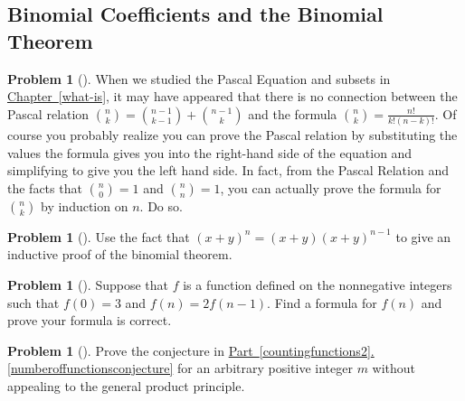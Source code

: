\documentclass[10pt,]{book}
\theoremstyle{plain}
\theoremstyle{definition}
\newtheorem{activity}[project]{Problem}
\theoremstyle{definition}
\numberwithin{equation}{chapter}
\newcommand{\importantarrow}{\Rightarrow}
\begin{document}
\subsection[{Binomial Coefficients and the Binomial Theorem}]{Binomial Coefficients and the Binomial Theorem}\label{subsection-12}
\begin{activity}[] \label{activity-72}
When we studied the Pascal Equation and subsets in \hyperref[what-is]{Chapter~\ref{what-is}}, it may have appeared that there is no connection between the Pascal relation \(\binom{n}{k} = \binom{n-1}{k-1} +\binom{n-1}{k}\) and the formula \(\binom{n}{k}=\frac{n!}{k!(n-k)!}\). Of course you probably realize you can prove the Pascal relation by substituting the values the formula gives you into the right-hand side of the equation and simplifying to give you the left hand side. In fact, from the Pascal Relation and the facts that \(\binom{n}{0}=1\) and \(\binom{n}{n}=1\), you can actually prove the formula for \(\binom{n}{k}\) by induction on \(n\). Do so.%
\end{activity}
\begin{activity}[]\marginsymbol[-1em]{\pdftooltip{$\importantarrow$}{especially interesting}} \label{activity-73}
Use the fact that \((x+y)^n = (x+y)(x+y)^{n-1}\) to give an inductive proof of the binomial theorem.%
\end{activity}
\begin{activity}[]\marginsymbol[-1em]{} \label{activity-74}
Suppose that \(f\) is a function defined on the nonnegative integers such that \(f(0)=3\) and \(f(n)=2f(n-1)\). Find a formula for \(f(n)\) and prove your formula is correct.%
\end{activity}
\begin{activity}[]\marginsymbol[-1em]{} \label{altproofnumberoffunctionsconjecture}
Prove the conjecture in \hyperref[numberoffunctionsconjecture]{Part~\ref{countingfunctions2}.\ref{numberoffunctionsconjecture}} for an arbitrary positive integer \(m\) without appealing to the general product principle.%
\end{activity}
\typeout{************************************************}
\typeout{************************************************}
\end{document}
